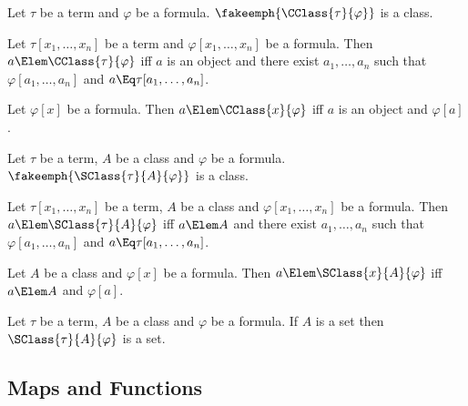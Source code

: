 \documentclass{stex}
\begin{document}
\begin{sparagraph}[style=symdoc,for=CClass]
  \begin{signature*}
    Let $\tau$ be a term and $\varphi$ be a formula.
    $\fakeemph{\CClass{\tau}{\varphi}}$ is a class.
  \end{signature*}

  \begin{axiom*}
    Let $\tau[x_1, \dots, x_n]$ be a term and $\varphi[x_1, \dots, x_n]$ be a formula.
    Then $a \Elem \CClass{\tau}{\varphi}$ iff
    $a$ is an object and there exist $a_1, \dots, a_n$ such that $\varphi[a_1, \dots, a_n]$ and $a \Eq \tau[a_1, \dots, a_n]$.
  \end{axiom*}

  \begin{proposition*}
    Let $\varphi[x]$ be a formula.
    Then $a \Elem \CClass{x}{\varphi}$ iff $a$ is an object and $\varphi[a]$.
  \end{proposition*}
\end{sparagraph}

\begin{sparagraph}[style=symdoc,for=SClass]
  \begin{signature*}
    Let $\tau$ be a term, $A$ be a class and $\varphi$ be a formula.
    $\fakeemph{\SClass{\tau}{A}{\varphi}}$ is a class.
  \end{signature*}

  \begin{axiom*}
    Let $\tau[x_1, \dots, x_n]$ be a term, $A$ be a class and $\varphi[x_1,\dots,x_n]$ be a formula.
    Then $a \Elem \SClass{\tau}{A}{\varphi}$ iff
    $a \Elem A$ and there exist $a_1, \dots, a_n$ such that $\varphi[a_1, \dots, a_n]$ and $a \Eq \tau[a_1, \dots, a_n]$.
  \end{axiom*}

  \begin{proposition*}
    Let $A$ be a class and $\varphi[x]$ be a formula.
    Then $a \Elem \SClass{x}{A}{\varphi}$ iff
    $a \Elem A$ and $\varphi[a]$.
  \end{proposition*}

  \begin{axiom*}
    Let $\tau$ be a term, $A$ be a class and $\varphi$ be a formula.
    If $A$ is a set then $\SClass{\tau}{A}{\varphi}$ is a set.
  \end{axiom*}
\end{sparagraph}


\subsection{Maps and Functions}\label{sec:maps-and-functions}
\end{document}

